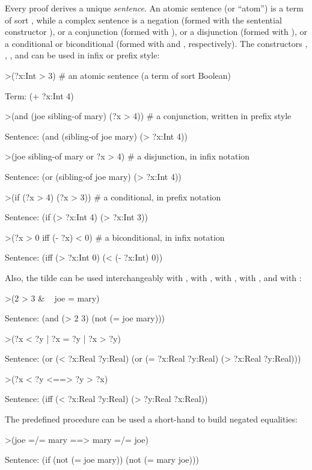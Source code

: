Every proof derives a unique \emph{sentence}. An atomic sentence (or ``atom'') is a term of sort , while a complex sentence is a negation (formed with the sentential constructor ), 
or a conjunction (formed with ), or a disjunction (formed with ), or a conditional or biconditional (formed with  and , respectively). 
The constructors , , , and  can be used in infix or prefix style:
\begin{tcAthena}[upquote=true]
>(?x:Int > 3) # an atomic sentence (a term of sort Boolean)

Term: (+ ?x:Int 4)

>(and (joe sibling-of mary) (?x > 4)) # a conjunction, written in prefix style

Sentence: (and (sibling-of joe mary)
               (> ?x:Int 4))


>(joe sibling-of mary or ?x > 4)      # a disjunction, in infix notation

Sentence: (or (sibling-of joe mary)
              (> ?x:Int 4))

>(if (?x > 4) (?x > 3))               # a conditional, in prefix notation

Sentence: (if (> ?x:Int 4)
              (> ?x:Int 3))

>(?x > 0 iff (- ?x) < 0)              # a biconditional, in infix notation

Sentence: (iff (> ?x:Int 0)
               (< (- ?x:Int)
                  0))
\end{tcAthena}
Also, the tilde \mtilde\msp can be used interchangeably with , \mtt{\&} with , \mtt{|} with , \mtt{==>} with , and \mtt{<==>} with :
\begin{tcAthena}[upquote=true]
>(2 > 3 & ~ joe = mary)

Sentence: (and (> 2 3)
               (not (= joe mary)))

>(?x < ?y | ?x = ?y | ?x > ?y)

Sentence: (or (< ?x:Real ?y:Real)
              (or (= ?x:Real ?y:Real)
                  (> ?x:Real ?y:Real)))

>(?x < ?y <==> ?y > ?x)

Sentence: (iff (< ?x:Real ?y:Real)
               (> ?y:Real ?x:Real))
\end{tcAthena}
The predefined procedure \mtt{=/=} can be used a short-hand to build negated equalities:
\begin{tcAthena}[upquote=true]
>(joe =/= mary ==> mary =/= joe)

Sentence: (if (not (= joe mary))
              (not (= mary joe)))
\end{tcAthena}


